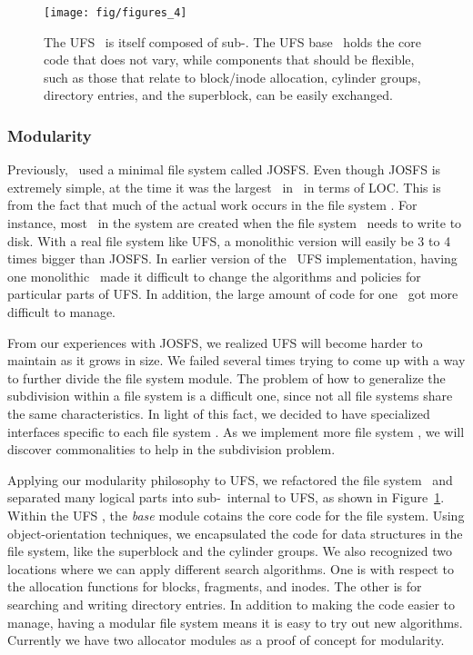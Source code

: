 \begin{figure}[htb]
  \centering
  \texttt{[image: fig/figures\_4]}
  \caption{\label{fig:ufsmodules} The UFS \module\ is itself composed of
  sub-\modules. The UFS base \module\ holds the core code that does not
  vary, while components that should be flexible, such as those that relate
  to block/inode allocation, cylinder groups, directory entries, and the
  superblock, can be easily exchanged.}
\end{figure}

\subsubsection {Modularity}
Previously, \Kudos\ used a minimal file system called JOSFS. Even though JOSFS
is extremely simple, at the time it was the largest \module\ in \Kudos\ in
terms of LOC. This is from the fact that much of the actual work occurs in the
file system \modules. For instance, most \chdescs\ in the system are created
when the file system \modules\ needs to write to disk. With a real file system
like UFS, a monolithic version will easily be 3 to 4 times bigger than JOSFS.
In earlier version of the \Kudos\ UFS implementation, having one monolithic
\module\ made it difficult to change the algorithms and policies for
particular parts of UFS. In addition, the large amount of code for one
\module\ got more difficult to manage.

From our experiences with JOSFS, we realized UFS will become harder to maintain
as it grows in size. We failed several times trying to come up with a way to
further divide the file system module. The problem of how to generalize the
subdivision within a file system is a difficult one, since not all file systems
share the same characteristics. In light of this fact, we decided to have
specialized interfaces specific to each file system \module. As we implement
more file system \modules, we will discover commonalities to help in the
subdivision problem.

Applying our modularity philosophy to UFS, we refactored the file system
\module\ and separated many logical parts into sub-\modules\ internal to UFS,
as shown in Figure~\ref{fig:ufsmodules}.
Within the UFS \module, the \emph{base} module cotains the core code for the
file system. Using object-orientation techniques, we encapsulated the code
for data structures in the file system, like the superblock and the cylinder
groups. We also recognized two locations where we can apply different
search algorithms. One is with respect to the allocation functions for blocks,
fragments, and inodes. The other is for searching and writing directory
entries. In addition to making the code easier to manage, having a modular
file system means it is easy to try out new algorithms. Currently we have
two allocator modules as a proof of concept for modularity.

